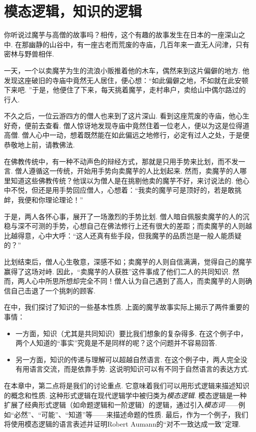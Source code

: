 \chapter{模态逻辑，知识的逻辑}\label{chap:modal-logic}

你听说过魔芋与高僧的故事吗？相传，这个有趣的故事发生在日本的一座深山之中. 在那幽静的山谷中，有一座古老而荒废的寺庙，几百年来一直无人问津，只有密林与野兽相伴. 

一天，一个以卖魔芋为生的流浪小贩推着他的木车，偶然来到这片偏僻的地方. 他发现这座破旧的寺庙中竟然无人居住，便心想：“如此偏僻之地，不如就在此安顿下来吧. ”于是，他便住了下来，每天挑着魔芋，走村串户，卖给山中偶尔路过的行人. 

不久之后，一位云游四方的僧人也来到了这片深山. 看到这座荒废的寺庙，他心生好奇，便前去查看. 僧人惊讶地发现寺庙中竟然住着一位老人，便以为这是位得道高僧. 僧人心中一动，想着既然能在如此偏远之地修行，必定有过人之处，于是便恭敬地上前，请教佛法. 

在佛教传统中，有一种不动声色的辩经方式，那就是只用手势来比划，而不发一言. 僧人遵循这一传统，开始用手势向卖魔芋的人比划起来. 然而，卖魔芋的人哪里知道这些佛教传统？他误以为僧人是在挑剔他卖的魔芋不好，来讨说法的. 他心中不悦，但还是用手势回应僧人，心想着：“我卖的魔芋可是顶好的，若是敢挑衅，我便和你理论理论！”

于是，两人各怀心事，展开了一场激烈的手势比划. 僧人暗自佩服卖魔芋的人的沉稳与深不可测的手势，心想自己在佛法修行上还有很大的差距；而卖魔芋的人则越比越得意，心中大呼：“这人还真有些手段，但我魔芋的品质岂是一般人能质疑的？”

比划结束后，僧人心生敬意，深感不如；卖魔芋的人则自信满满，觉得自己的魔芋赢得了这场对峙. 因此，“卖魔芋的人获胜”这件事成了他们二人的共同知识. 然而，两人心中所思所想却完全不同！僧人认为自己遇到了高人，而卖魔芋的人则确信自己击退了一个挑刺的顾客. 

在中，我们探讨了知识的一些基本性质. 上面的魔芋故事实际上揭示了两件重要的事情：
\begin{itemize}
    \item 一方面，知识（尤其是共同知识）要比我们想象的复杂得多. 在这个例子中，两个人知道的“事实”究竟是不是同样的呢？这个问题并不容易回答. 
    \item 另一方面，知识的传递与理解可以超越自然语言. 在这个例子中，两人完全没有用语言交流，而是依靠手势. 这说明知识可以有不同于自然语言的表达方式. 
\end{itemize}

在本章中，第二点将是我们的讨论重点. 它意味着我们可以用形式逻辑来描述知识的概念和性质. 这种形式逻辑在现代逻辑学中被归类为\emph{模态逻辑}. 模态逻辑是一种扩展了经典形式逻辑（如命题逻辑和一阶逻辑）的逻辑，通过引入\emph{模态词}——例如“必然”、“可能”、“知道”等——来描述命题的性质. 最后，作为一个例子，我们将使用模态逻辑的语言表述并证明Robert Aumann的“对不一致达成一致”定理. 

